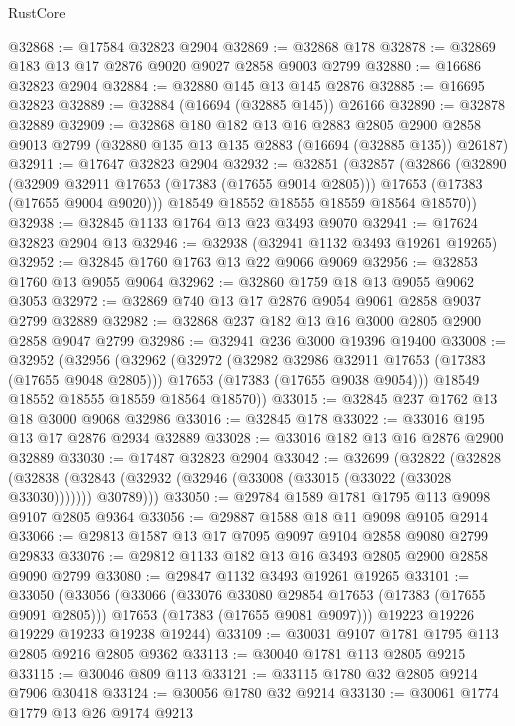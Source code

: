 \begin{lexlean}{RustCore}
\begin{coremodule}
@32868 := @17584 @32823 @2904
@32869 := @32868 @178
@32878 := @32869 @183 @13 @17 @2876 @9020 @9027 @2858 @9003 @2799
@32880 := @16686 @32823 @2904
@32884 := @32880 @145 @13 @145 @2876
@32885 := @16695 @32823
@32889 := @32884 (@16694 (@32885 @145)) @26166
@32890 := @32878 @32889
@32909 := @32868
    @180
    @182
    @13
    @16
    @2883
    @2805
    @2900
    @2858
    @9013
    @2799
    (@32880 @135 @13 @135 @2883 (@16694 (@32885 @135)) @26187)
@32911 := @17647 @32823 @2904
@32932 := @32851
    (@32857
      (@32866
        (@32890
          (@32909 @32911 @17653 (@17383 (@17655 @9014 @2805)))
          @17653
          (@17383 (@17655 @9004 @9020)))
        @18549
        @18552
        @18555
        @18559
        @18564
        @18570))
@32938 := @32845 @1133 @1764 @13 @23 @3493 @9070
@32941 := @17624 @32823 @2904 @13
@32946 := @32938 (@32941 @1132 @3493 @19261 @19265)
@32952 := @32845 @1760 @1763 @13 @22 @9066 @9069
@32956 := @32853 @1760 @13 @9055 @9064
@32962 := @32860 @1759 @18 @13 @9055 @9062 @3053
@32972 := @32869 @740 @13 @17 @2876 @9054 @9061 @2858 @9037 @2799 @32889
@32982 := @32868 @237 @182 @13 @16 @3000 @2805 @2900 @2858 @9047 @2799
@32986 := @32941 @236 @3000 @19396 @19400
@33008 := @32952
    (@32956
      (@32962
        (@32972
          (@32982 @32986 @32911 @17653 (@17383 (@17655 @9048 @2805)))
          @17653
          (@17383 (@17655 @9038 @9054)))
        @18549
        @18552
        @18555
        @18559
        @18564
        @18570))
@33015 := @32845 @237 @1762 @13 @18 @3000 @9068 @32986
@33016 := @32845 @178
@33022 := @33016 @195 @13 @17 @2876 @2934 @32889
@33028 := @33016 @182 @13 @16 @2876 @2900 @32889
@33030 := @17487 @32823 @2904
@33042 := @32699
    (@32822
      (@32828
        (@32838 (@32843 (@32932 (@32946 (@33008 (@33015 (@33022 (@33028 @33030))))))) @30789)))
@33050 := @29784 @1589 @1781 @1795 @113 @9098 @9107 @2805 @9364
@33056 := @29887 @1588 @18 @11 @9098 @9105 @2914
@33066 := @29813 @1587 @13 @17 @7095 @9097 @9104 @2858 @9080 @2799 @29833
@33076 := @29812 @1133 @182 @13 @16 @3493 @2805 @2900 @2858 @9090 @2799
@33080 := @29847 @1132 @3493 @19261 @19265
@33101 := @33050
    (@33056
      (@33066
        (@33076 @33080 @29854 @17653 (@17383 (@17655 @9091 @2805)))
        @17653
        (@17383 (@17655 @9081 @9097)))
      @19223
      @19226
      @19229
      @19233
      @19238
      @19244)
@33109 := @30031 @9107 @1781 @1795 @113 @2805 @9216 @2805 @9362
@33113 := @30040 @1781 @113 @2805 @9215
@33115 := @30046 @809 @113
@33121 := @33115 @1780 @32 @2805 @9214 @7906 @30418
@33124 := @30056 @1780 @32 @9214
@33130 := @30061 @1774 @1779 @13 @26 @9174 @9213

\end{coremodule}
\end{lexlean}
